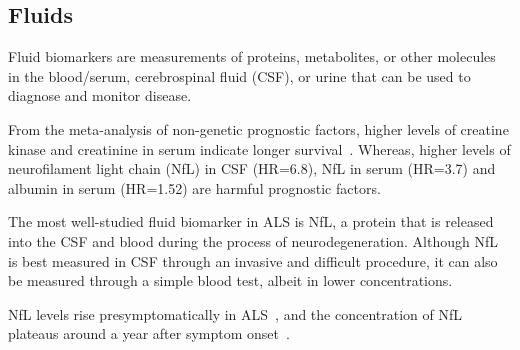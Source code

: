 

\subsection{Fluids}

Fluid biomarkers are measurements of proteins, metabolites, or other molecules in the blood/serum, cerebrospinal fluid (CSF), or urine that can be used to diagnose and monitor disease.

From the meta-analysis of non-genetic prognostic factors, higher levels of creatine kinase and creatinine in serum indicate longer survival~\cite{suPredictorsSurvivalPatients2021}.
Whereas, higher levels of neurofilament light chain (NfL) in CSF (HR=6.8), NfL in serum (HR=3.7) and albumin in serum (HR=1.52) are harmful prognostic factors.

The most well-studied fluid biomarker in ALS is NfL, a protein that is released into the CSF and blood during the process of neurodegeneration.
Although NfL is best measured in CSF through an invasive and difficult procedure, it can also be measured through a simple blood test, albeit in lower concentrations.

NfL levels rise presymptomatically in ALS~\cite{benatarValidationSerumNeurofilaments2020}, and the concentration of NfL plateaus around a year after symptom onset~\cite{benatarNeurofilamentsPresymptomaticALS2019, benatarValidationSerumNeurofilaments2020, thompsonMulticentreAppraisalAmyotrophic2022}.

